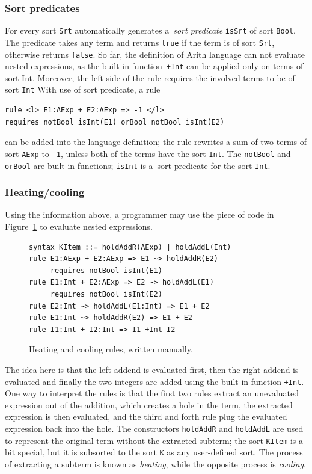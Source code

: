 \documentclass{fithesis3}
\begin{document}
\subsubsection{Sort predicates}

For every sort \texttt{Srt} \K automatically generates a~\textit{sort predicate} \texttt{isSrt} of sort \texttt{Bool}. The predicate takes any term and returns \texttt{true} if the term is of sort \texttt{Srt}, otherwise returns \texttt{false}. So far, the definition of Arith language can not evaluate nested expressions, as the built-in function~\texttt{+Int} can be applied only on terms of sort Int. Moreover, the left side of the rule requires the involved terms to be of sort \texttt{Int} With use of sort predicate, a rule
\begin{lstlisting}
rule <l> E1:AExp + E2:AExp => -1 </l>
requires notBool isInt(E1) orBool notBool isInt(E2)
\end{lstlisting}
can be added into the language definition; the rule rewrites a sum of two terms of sort \texttt{AExp} to \lstinline{-1}{}, unless both of the terms have the sort \texttt{Int}. The \texttt{notBool} and \texttt{orBool} are built-in functions; \texttt{isInt} is a~sort predicate for the sort \texttt{Int}.


\subsubsection{Heating/cooling}
Using the information above, a programmer may use the piece of \K code in Figure~\ref{manualHeatCool} to evaluate nested expressions.
\begin{figure}
\begin{lstlisting}
syntax KItem ::= holdAddR(AExp) | holdAddL(Int)
rule E1:AExp + E2:AExp => E1 ~> holdAddR(E2)
     requires notBool isInt(E1)
rule E1:Int + E2:AExp => E2 ~> holdAddL(E1)
     requires notBool isInt(E2)
rule E2:Int ~> holdAddL(E1:Int) => E1 + E2
rule E1:Int ~> holdAddR(E2) => E1 + E2
rule I1:Int + I2:Int => I1 +Int I2
\end{lstlisting}
\caption{Heating and cooling rules, written manually.}
\label{manualHeatCool}
\end{figure}
The idea here is that the left addend is evaluated first, then the right addend is evaluated and finally the two integers are added using the built-in function \texttt{+Int}. One way to interpret the rules is that the first two rules extract an unevaluated expression out of the addition, which creates a hole in the term, the extracted expression is then evaluated, and the third and forth rule plug the evaluated expression back into the hole. The constructors \texttt{holdAddR} and \texttt{holdAddL} are used to represent the original term without the extracted subterm; the sort \texttt{KItem} is a bit special, but it is subsorted to the sort \texttt{K} as any user-defined sort. The process of extracting a subterm is known as \textit{heating}, while the opposite process is \textit{cooling}. 
\end{document}
